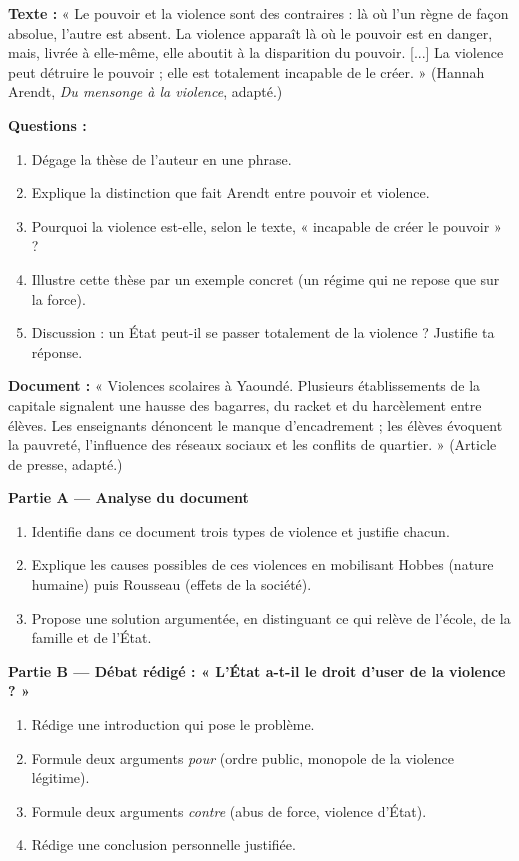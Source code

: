 \documentclass[11pt]{article}
\begin{document}
\begin{exercice}
\textbf{Texte :} « Le pouvoir et la violence sont des contraires : là où l'un règne de façon absolue, l'autre est absent. La violence apparaît là où le pouvoir est en danger, mais, livrée à elle-même, elle aboutit à la disparition du pouvoir. [...] La violence peut détruire le pouvoir ; elle est totalement incapable de le créer. » (Hannah Arendt, \emph{Du mensonge à la violence}, adapté.)

\textbf{Questions :}
\begin{enumerate}
\item Dégage la thèse de l'auteur en une phrase.
\item Explique la distinction que fait Arendt entre pouvoir et violence.
\item Pourquoi la violence est-elle, selon le texte, « incapable de créer le pouvoir » ?
\item Illustre cette thèse par un exemple concret (un régime qui ne repose que sur la force).
\item Discussion : un État peut-il se passer totalement de la violence ? Justifie ta réponse.
\end{enumerate}
\end{exercice}

\begin{exercice}
\textbf{Document :} « Violences scolaires à Yaoundé. Plusieurs établissements de la capitale signalent une hausse des bagarres, du racket et du harcèlement entre élèves. Les enseignants dénoncent le manque d'encadrement ; les élèves évoquent la pauvreté, l'influence des réseaux sociaux et les conflits de quartier. » (Article de presse, adapté.)

\textbf{Partie A — Analyse du document}
\begin{enumerate}
\item Identifie dans ce document trois types de violence et justifie chacun.
\item Explique les causes possibles de ces violences en mobilisant Hobbes (nature humaine) puis Rousseau (effets de la société).
\item Propose une solution argumentée, en distinguant ce qui relève de l'école, de la famille et de l'État.
\end{enumerate}

\textbf{Partie B — Débat rédigé : « L'État a-t-il le droit d'user de la violence ? »}
\begin{enumerate}
\item Rédige une introduction qui pose le problème.
\item Formule deux arguments \emph{pour} (ordre public, monopole de la violence légitime).
\item Formule deux arguments \emph{contre} (abus de force, violence d'État).
\item Rédige une conclusion personnelle justifiée.
\end{enumerate}
\end{exercice}
\end{document}
